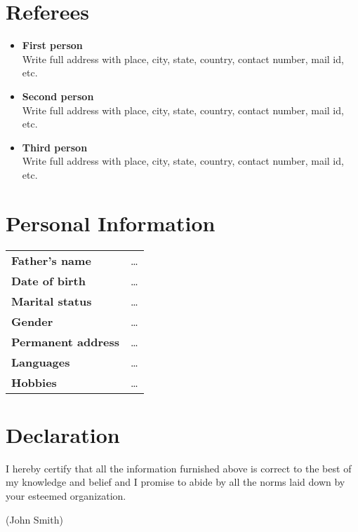 \documentclass[11pt,a4paper]{moderncv}
\begin{document}
\section{Referees}

\begin{itemize}  	
	
    \item \textbf{First person}\\
	Write full address with place, city, state, country, contact number, mail id, etc.
	
	\item \textbf{Second person}\\
    Write full address with place, city, state, country, contact number, mail id, etc.
	
	\item \textbf{Third person}\\
	Write full address with place, city, state, country, contact number, mail id, etc.

\end{itemize}

\section{Personal Information}

\begin{tabular}{p{4cm}l}
\textbf{Father's name}         &    \ldots	\\
\textbf{Date of birth}         &    \ldots \\
\textbf{Marital status}        &    \ldots     \\
\textbf{Gender}                &    \ldots \\
\textbf{Permanent address}     &    \ldots \\
\textbf{Languages}             &    \ldots \\
\textbf{Hobbies}               &    \ldots
\end{tabular}

\section{Declaration}
I hereby certify that all the information furnished above is correct to the best of my knowledge and belief and I promise to abide by all the norms laid down by your esteemed organization.

\vskip10mm\raggedleft
(John Smith)
\end{document}
